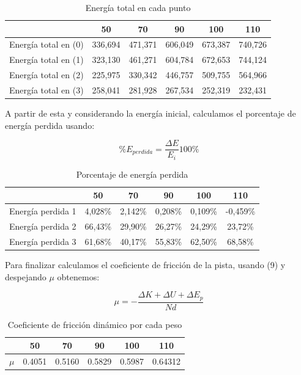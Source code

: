 \documentclass[a4paper]{article}
\begin{document}
\begin{table}[!ht]
    \centering
    \begin{tabular}{|c|c|c|c|c|c|}
    \hline
        ~ & 50 & 70 & 90 & 100 & 110  \\ \hline
        Energía total en (0) & 336,694 & 471,371 & 606,049 & 673,387 & 740,726  \\ \hline
        Energía total en (1) & 323,130 & 461,271 & 604,784 & 672,653 & 744,124  \\ \hline
        Energía total en (2) & 225,975 & 330,342 & 446,757 & 509,755 & 564,966  \\ \hline
        Energía total en (3) & 258,041 & 281,928 & 267,534 & 252,319 & 232,431  \\ \hline
    \end{tabular}
    \caption{Energía total en cada punto}
    \label{Energía total en cada punto}
\end{table}

A partir de esta y considerando la energía inicial, calculamos el porcentaje de energía perdida usando:

\[\% E_{perdida} = \frac{\Delta E}{E_i}100\%\]

\begin{table}[!ht]
    \centering
    \begin{tabular}{|c|c|c|c|c|c|}
    \hline
        ~ & 50 & 70 & 90 & 100 & 110  \\ \hline
        Energía perdida 1 & 4,028\% & 2,142\% & 0,208\% & 0,109\% & -0,459\%  \\ \hline
        Energía perdida 2 & 66,43\% & 29,90\% & 26,27\% & 24,29\% & 23,72\%  \\ \hline
        Energía perdida 3 & 61,68\% & 40,17\% & 55,83\% & 62,50\% & 68,58\%  \\ \hline
    \end{tabular}
    \caption{Porcentaje de energía perdida}
    \label{Porcentaje de energía perdida}
\end{table}

Para finalizar calculamos el coeficiente de fricción de la pista, usando (9) y despejando $\mu$ obtenemos:

\[ \mu = - \frac{\Delta K+\Delta U+\Delta E_p}{Nd}\]

\begin{table}[H]
\centering
    \begin{tabular}{|c|c|c|c|c|c|}
    \hline
        & 50 & 70 & 90 & 100 & 110 \\ \hline
        $\mu$ &  0.4051 & 0.5160 & 0.5829 & 0.5987 & 0.64312 \\ \hline
    \end{tabular}
    \caption{Coeficiente de fricción dinámico por cada peso}
    \label{Coeficiente de fricción dinámico}
\end{table}
\end{document}
